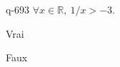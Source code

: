 \begin{truefalse}{q-693}
$\forall x \in \mathbb R,\: 1/x>-3$.
\item Vrai
\item* Faux
\end{truefalse}

